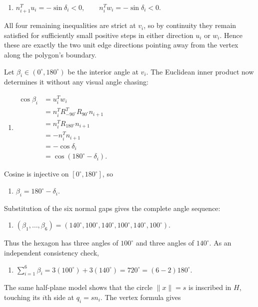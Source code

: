 \begin{enumerate}
 
            \begin{enumerate}[label=(\roman*)]
                \item $n_{i+1}^Tu_i=-\sin\delta_i<0,\qquad n_i^Tw_i=-\sin\delta_i<0.$
            \end{enumerate}
            All four remaining inequalities are strict at $v_i$, so by continuity they remain satisfied for sufficiently small positive steps in either direction $u_i$ or $w_i$. Hence these are exactly the two unit edge directions pointing away from the vertex along the polygon's boundary.

 Let $\beta_i\in(0^\circ,180^\circ)$ be the interior angle at $v_i$. The Euclidean inner product now determines it without any visual angle chasing:

 
            \begin{enumerate}[label=(\roman*)]
                \item $\begin{aligned} \cos\beta_i &=u_i^Tw_i\\ &=n_i^TR_{-90^\circ}^TR_{90^\circ}n_{i+1}\\ &=n_i^TR_{180^\circ}n_{i+1}\\ &=-n_i^Tn_{i+1}\\ &=-\cos\delta_i\\ &=\cos(180^\circ-\delta_i). \end{aligned}$
            \end{enumerate}
            Cosine is injective on $[0^\circ,180^\circ]$, so

 
            \begin{enumerate}[label=(\roman*)]
                \item $\beta_i=180^\circ-\delta_i.$
            \end{enumerate}
            Substitution of the six normal gaps gives the complete angle sequence:

 
            \begin{enumerate}[label=(\roman*)]
                \item $(\beta_1,\ldots,\beta_6) =(140^\circ,100^\circ,140^\circ,100^\circ,140^\circ,100^\circ).$
            \end{enumerate}
            Thus the hexagon has three angles of $100^\circ$ and three angles of $140^\circ$. As an independent consistency check,

 
            \begin{enumerate}[label=(\roman*)]
                \item $\sum_{i=1}^{6}\beta_i =3(100^\circ)+3(140^\circ) =720^\circ=(6-2)180^\circ.$
            \end{enumerate}
            The same half-plane model shows that the circle $\|x\|=s$ is inscribed in $H$, touching its $i$th side at $q_i=sn_i$. The vertex formula gives


\end{enumerate}
